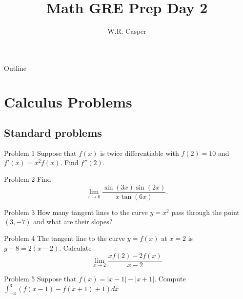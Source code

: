 \documentclass{beamer}
\title{Math GRE Prep Day 2}
\subtitle
{} %
\author[W.R. Casper] %
{W.R. Casper}
\institute[California State University Fullerton] %
{
  Department of Mathematics\\
  California State University Fullerton}
\begin{document}
\begin{frame}
  \titlepage
\end{frame}

\begin{frame}{Outline}
  \tableofcontents
\end{frame}



\section{Calculus Problems}

\subsection{Standard problems}


\begin{frame}{Problem 1}
Suppose that $f(x)$ is twice differentiable with $f(2) = 10$ and $f'(x) = x^2f(x)$.
Find $f''(2)$.
\end{frame}

\begin{frame}{Problem 2}
Find
$$\lim_{x\rightarrow 0}\frac{\sin(3x)\sin(2x)}{x\tan(6x)}.$$
\end{frame}

\begin{frame}{Problem 3}
How many tangent lines to the curve $y=x^2$ pass through the point $(3,-7)$ and what are their slopes?
\end{frame}

\begin{frame}{Problem 4}
The tangent line to the curve $y = f(x)$ at $x=2$ is $y-8 = 2(x-2)$.  Calculate
$$\lim_{x\rightarrow 2}\frac{xf(2)-2f(x)}{x-2}$$
\end{frame}

\begin{frame}{Problem 5}
Suppose that $f(x) = |x-1|-|x+1|$.  Compute $\int_{-3}^3(f(x-1)-f(x+1)+1)dx$
\end{frame}
\end{document}
